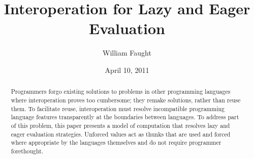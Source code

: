 \documentclass[12pt]{article}
\begin{document}
\title{Interoperation for Lazy and Eager Evaluation}
\author{William Faught}
\date{April 10, 2011}
\maketitle

\begin{abstract}
Programmers forgo existing solutions to problems in other programming languages where interoperation proves too cumbersome; they remake solutions, rather than reuse them. To facilitate reuse, interoperation must resolve incompatible programming language features transparently at the boundaries between languages. To address part of this problem, this paper presents a model of computation that resolves lazy and eager evaluation strategies. Unforced values act as thunks that are used and forced where appropriate by the languages themselves and do not require programmer forethought.
\end{abstract}






\clearpage

\nocite{*}


\end{document}
